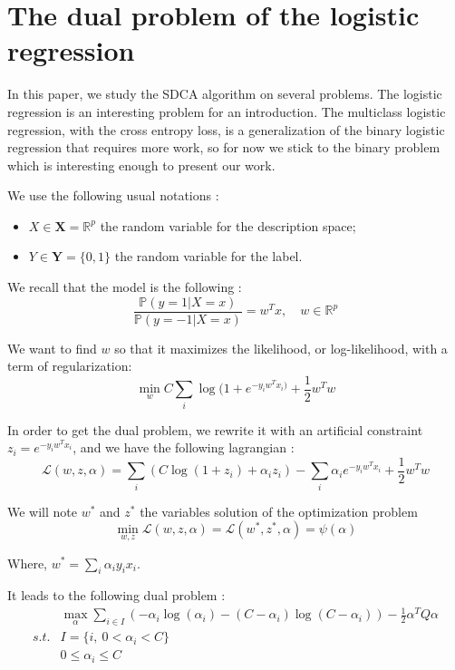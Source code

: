 \documentclass{article}
\begin{document}
\newpage
\section{The dual problem of the logistic regression}

In this paper, we study the SDCA algorithm on several problems.
The logistic regression is an interesting problem for an introduction.
The multiclass logistic regression, with the cross entropy loss, is a generalization of the binary logistic regression that requires more work, so for now we stick to the binary problem which is interesting enough to present our work.

We use the following usual notations :
\begin{itemize}
	\item[] $X \in \mathbf{X} = \mathbb{R}^p$ the random variable for the description space;
	\item[] $Y \in \mathbf{Y} = \{0,1\}$ the random variable for the label.
\end{itemize}

We recall that the model is the following :
\begin{equation}
	\frac{\mathbb{P}(y=1 | X=x)}{\mathbb{P}(y=-1 |X=x)} = w^T x, \quad w \in \mathbb{R}^p
\end{equation}

We want to find $w$ so that it maximizes the likelihood, or log-likelihood, with a term of regularization:
\begin{equation}
	\min_w C \sum_i \log(1 + e^{-y_iw^Tx_i)}  + \frac{1}{2} w^Tw
\end{equation}

In order to get the dual problem, we rewrite it with an artificial constraint $z_i = e^{-y_iw^Tx_i}$, and we have the following lagrangian :
\begin{equation}
	\mathcal{L}(w, z, \alpha) = \sum_i (C \log(1+z_i) + \alpha_i z_i) - \sum_i \alpha_i e^{-y_iw^Tx_i} + \frac{1}{2}w^Tw 
\end{equation}

We will note $w^*$ and $z^*$ the variables solution of the optimization problem
\begin{equation}
	\min_{w, z} \mathcal{L}(w, z, \alpha) = \mathcal{L}(w^*, z^*, \alpha) = \psi(\alpha) 
\end{equation}

Where, $w^* = \sum_i \alpha_i y_i x_i$.

It leads to the following dual problem :
\begin{equation}
	\begin{array}{cl}
		     &\max_{\alpha} \sum_{i \in I} (-\alpha_i \log(\alpha_i) - (C-\alpha_i) \log(C - \alpha_i)) - \frac{1}{2} \alpha^TQ\alpha\\
		s.t. &I = \{i,\ 0 < \alpha_i < C \}\\
		     &0 \leq \alpha_i \leq C
	\end{array}
\end{equation}
\end{document}
